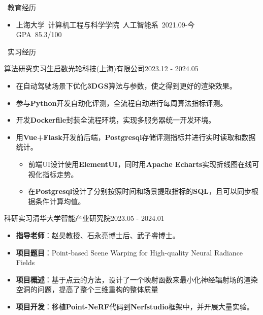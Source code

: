 \documentclass[UTF8]{resume}
\begin{document}
\begin{rSection}{\faGraduationCap~教育经历}
    \begin{itemize}
        \item 上海大学~计算机工程与科学学院~人工智能系~\hfill 2021.09-今 \\ GPA~85.3/100
    \end{itemize}
\end{rSection}
 
\begin{rSection}{\faBriefcase~实习经历}
    \begin{rExperience}{算法研究实习生}{启数光轮科技(上海)有限公司}{2023.12 - 2024.05}
        \begin{itemize}
            \itemsep -0.5em \vspace{-0.5em}
            \item 在自动驾驶场景下优化\textbf{3DGS}算法与参数，使之得到更好的渲染效果。
            \item 参与\textbf{Python}开发自动化评测，全流程自动进行每周算法指标评测。
            \item 开发\textbf{Dockerfile}封装全流程环境，实现多服务器统一开发环境。
            \item 用\textbf{Vue+Flask}开发前后端，\textbf{Postgresql}存储评测指标并进行实时读取和数据统计。
            \begin{itemize}
                \item 前端UI设计使用\textbf{ElementUI}，同时用\textbf{Apache Echarts}实现折线图在线可视化指标走势。
                \item 在\textbf{Postgresql}设计了分别按照时间和场景提取指标的\textbf{SQL}，且可以同步根据条件计算均值。
            \end{itemize}
        \end{itemize}
    \end{rExperience}

    \begin{rExperience}{科研实习}{清华大学智能产业研究院}{2023.05 - 2024.01}
        \begin{itemize}
            \itemsep -0.5em \vspace{-0.5em}
            \item \textbf{指导老师}：赵昊教授、石永亮博士后、武子睿博士。
            \item \textbf{项目题目}：Point-based Scene Warping for High-quality Neural Radiance Fields
            \item \textbf{项目概述}：基于点云的方法，设计了一个映射函数来最小化神经辐射场的渲染空洞的问题，提高了整个三维重构的整体质量
            \item \textbf{项目开发}：移植\textbf{Point-NeRF}代码到\textbf{Nerfstudio}框架中，并开展大量实验。
        \end{itemize}
    \end{rExperience}
\end{rSection}
\end{document}
